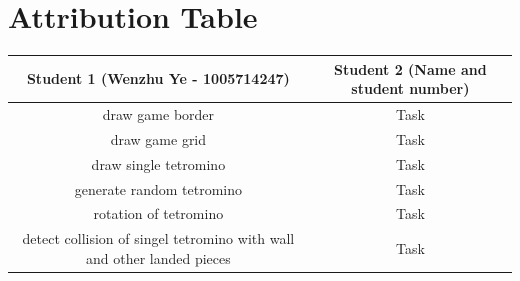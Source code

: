 \documentclass{article}
\begin{document}
\section{Attribution Table}

\begin{center}
\begin{tabular}{|| c | c ||}
\hline
 Student 1 (Wenzhu Ye - 1005714247) &  Student 2 (Name and student number) \\ 
 \hline
 draw game border & Task\\
 \hline
 draw game grid & Task\\
 \hline
 draw single tetromino & Task\\ 
 \hline
 generate random tetromino & Task\\ 
 \hline
 rotation of tetromino & Task\\
 \hline
 detect collision of singel tetromino with wall and other landed pieces & Task\\  
 \hline
\end{tabular}
\end{center}

\end{document}
